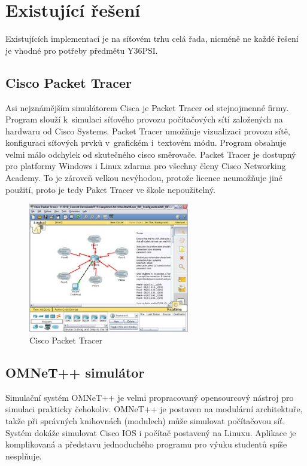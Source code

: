 \chapter{Existující řešení}
Existujících implementací je na síťovém trhu celá řada, nicméně ne každé řešení je vhodné pro potřeby předmětu Y36PSI.

\section{Cisco Packet Tracer}
Asi nejznámějším simulátorem Cisca je Packet Tracer \cite{cisco:pt} od stejnojmenné firmy. Program slouží k~simulaci síťového provozu počítačových sítí založených na hardwaru od Cisco Systems. Packet Tracer umožňuje vizualizaci provozu sítě, konfiguraci síťových prvků v~grafickém i~textovém módu. Program obsahuje velmi málo odchylek od skutečného cisco směrovače. Packet Tracer je dostupný pro platformy Windows i Linux zdarma pro všechny členy Cisco Networking Academy. To je zároveň velkou nevýhodou, protože licence neumožňuje jiné použití, proto je tedy Paket Tracer ve škole nepoužitelný.

\begin{figure}[h]
\begin{center}
\includegraphics[width=7cm]{figures/r_cpt}
\caption{Cisco Packet Tracer}
\label{fig:r_cpt}
\end{center}
\end{figure}

\section{OMNeT++ simulátor} 
Simulační systém OMNeT++ \cite{reserse:omnet_hp} je velmi propracovaný opensourcový nástroj pro simulaci prakticky čehokoliv. OMNeT++ je postaven na modulární architektuře, takže při správných knihovnách (modulech) může simulovat počítačovou síť. Systém dokáže simulovat Cisco IOS i počítač postavený na Linuxu. Aplikace je komplikovaná a představu jednoduchého programu pro výuku studentů spíše nesplňuje.

